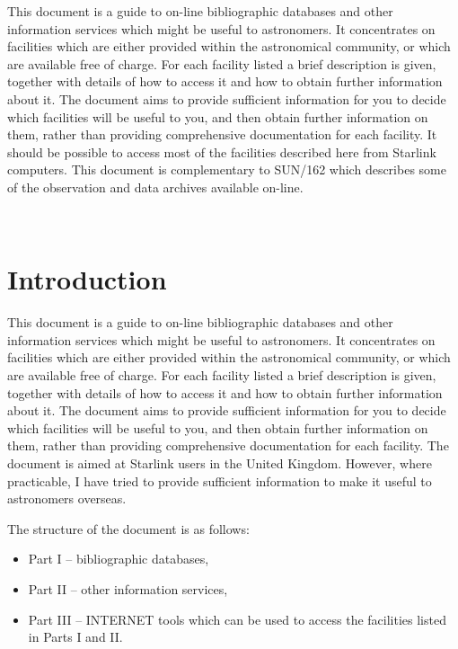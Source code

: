 \documentclass[twoside,11pt]{article}
\newcommand{\stardocinitials}  {SUN}
\newcommand{\stardocnumber}    {174.1}
\newcommand{\stardocabstract}  {
This document is a guide to on-line bibliographic databases and other 
information services which might be useful to astronomers. It 
concentrates on facilities which are either provided within the 
astronomical community, or which are available free of charge. For
each facility listed a brief description is given, together with details
of how to access it and how to obtain further information about it.
The document aims to provide sufficient information for you to decide 
which facilities will be useful to you, and then obtain further 
information on them, rather than providing comprehensive documentation 
for each facility. It should be possible to access most of the 
facilities described here from Starlink computers. This document is 
complementary to SUN/162 which describes some of the observation and 
data archives available on-line.
}
\newcommand{\stardocname}{\stardocinitials /\stardocnumber}
\newenvironment{latexonly}{}{}
\newcommand{\xlabel}[1]{}
\renewcommand{\thepage}{\roman{page}}
\begin{document}
\stardocabstract
\newpage
\begin{latexonly}
   \setlength{\parskip}{0mm}
   \tableofcontents
   \setlength{\parskip}{\medskipamount}
   \markright{\stardocname}
\end{latexonly}
\newpage
~
\newpage
\renewcommand{\thepage}{\arabic{page}}
\setcounter{page}{1}

\section{Introduction\xlabel{introduction}}

This document is a guide to on-line bibliographic databases and other 
information services which might be useful to astronomers. It 
concentrates on facilities which are either provided within the 
astronomical community, or which are available free of charge. For
each facility listed a brief description is given, together with details
of how to access it and how to obtain further information about it.
The document aims to provide sufficient information for you to decide 
which facilities will be useful to you, and then obtain further 
information on them, rather than providing comprehensive documentation 
for each facility. The document is aimed at Starlink users in the 
United Kingdom. However, where practicable, I have tried to provide 
sufficient information to make it useful to astronomers overseas. 

The structure of the document is as follows:

\begin{itemize}

  \item Part I -- bibliographic databases,

  \item Part II -- other information services,

  \item Part III -- INTERNET tools which can be used to access the
   facilities listed in Parts I and II.

\end{itemize}
\end{document}
